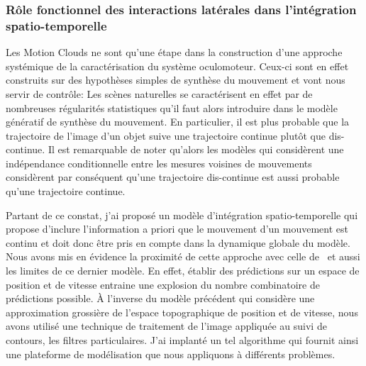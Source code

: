 \subsubsection{Rôle fonctionnel des interactions latérales dans l'intégration spatio-temporelle~\citep{KhoeiMassonPerrinet17}%
}%
\label{sec:prediction}%
Les Motion Clouds ne sont qu'une étape dans la construction d'une approche systémique de la caractérisation du système oculomoteur. Ceux-ci sont en effet construits sur des hypothèses simples de synthèse du mouvement et vont nous servir de contrôle: Les scènes naturelles se caractérisent en effet par de nombreuses régularités statistiques qu'il faut alors introduire dans le modèle génératif de synthèse du mouvement. En particulier, il est plus probable que la trajectoire de l'image d'un objet suive une trajectoire continue plutôt que dis-continue. Il est remarquable de noter qu'alors les modèles qui considèrent une indépendance conditionnelle entre les mesures voisines de mouvements considèrent par conséquent qu'une trajectoire dis-continue est aussi probable qu'une trajectoire continue.

Partant de ce constat, j'ai proposé un modèle d'intégration spatio-temporelle qui propose d'inclure l'information a priori que le mouvement d'un mouvement est continu et doit donc être pris en compte dans la dynamique globale du modèle. Nous avons mis en évidence la proximité de cette approche avec celle de~\citet{Burgi00} et aussi les limites de ce dernier modèle. En effet, établir des prédictions sur un espace de position et de vitesse entraine une explosion du nombre combinatoire de prédictions possible. À l'inverse du modèle précédent qui considère une approximation grossière de l'espace topographique de position et de vitesse, nous avons utilisé une technique de traitement de l'image appliquée au suivi de contours, les filtres particulaires. J'ai implanté un tel algorithme qui fournit ainsi une plateforme de modélisation que nous appliquons à différents problèmes.

